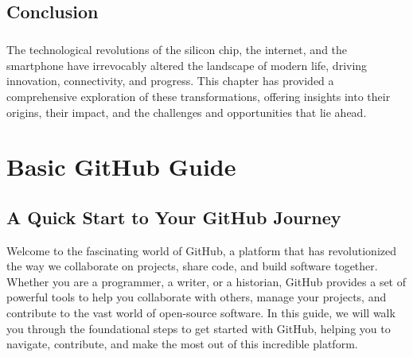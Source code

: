 \documentclass[a4paper,12pt]{book}
\begin{document}
\section*{Conclusion}
\paragraph{}
The technological revolutions of the silicon chip, the internet, and the smartphone have irrevocably altered the landscape of modern life, driving innovation, connectivity, and progress. This chapter has provided a comprehensive exploration of these transformations, offering insights into their origins, their impact, and the challenges and opportunities that lie ahead.




\clearpage
{}
\appendix
\renewcommand{\thechapter}{\roman{chapter}} %






\chapter{Basic GitHub Guide}
\section*{A Quick Start to Your GitHub Journey}


Welcome to the fascinating world of GitHub, a platform that has revolutionized the way we collaborate on projects, share code, and build software together. Whether you are a programmer, a writer, or a historian, GitHub provides a set of powerful tools to help you collaborate with others, manage your projects, and contribute to the vast world of open-source software. In this guide, we will walk you through the foundational steps to get started with GitHub, helping you to navigate, contribute, and make the most out of this incredible platform.
\end{document}
